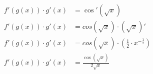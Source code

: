 \documentclass[preview]{standalone}
\begin{document}
\begin{align*}
f'(g(x)) \cdot g'(x)&= \cos'(\sqrt{x}) \\ f'(g(x)) \cdot g'(x)&=cos(\sqrt{x}) \cdot (\sqrt{x})' \\ f'(g(x)) \cdot g'(x)&=cos(\sqrt{x}) \cdot (\frac{1}{2} \cdot x^{-\frac{1}{2}}) \\ f'(g(x)) \cdot g'(x)&=\frac{\cos(\sqrt{x})}{2\sqrt{x}}
\end{align*}
\end{document}
